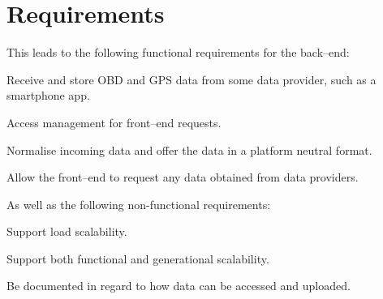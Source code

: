 \section{Requirements}\label{sec:requirements}
This leads to the following functional requirements for the back--end:
\begin{eletterate}
    \item Receive and store \ac{OBD} and GPS data from some data provider, such as a smartphone app.
    \item Access management for front--end requests.
    \item Normalise incoming data and offer the data in a platform neutral format. %
    \item Allow the front--end to request any data obtained from data providers.
\end{eletterate}
As well as the following non-functional requirements:
\begin{eletterate}[resume]
    \item Support load scalability.%
    \item Support both functional and generational scalability.
    \item Be documented in regard to how data can be accessed and uploaded.
\end{eletterate}




